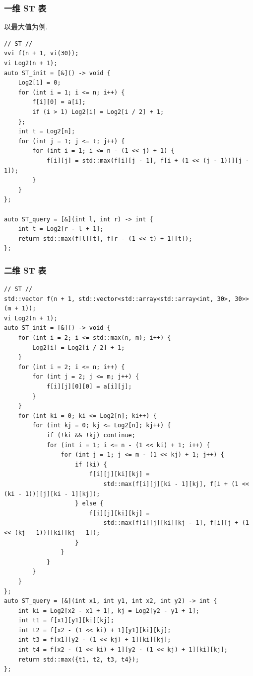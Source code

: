 \documentclass[UTF8, a4paper, titlepage, twoside]{ctexart}
\begin{document}
\subsubsection{ 一维 ST 表 }
以最大值为例. 
\begin{lstlisting}[style = cpp]
// ST //
vvi f(n + 1, vi(30));
vi Log2(n + 1);
auto ST_init = [&]() -> void {
    Log2[1] = 0;
    for (int i = 1; i <= n; i++) {
        f[i][0] = a[i];
        if (i > 1) Log2[i] = Log2[i / 2] + 1;
    };
    int t = Log2[n];
    for (int j = 1; j <= t; j++) {
        for (int i = 1; i <= n - (1 << j) + 1) {
            f[i][j] = std::max(f[i][j - 1], f[i + (1 << (j - 1))][j - 1]);
        }
    }
};

auto ST_query = [&](int l, int r) -> int {
    int t = Log2[r - l + 1];
    return std::max(f[l][t], f[r - (1 << t) + 1][t]);
};
\end{lstlisting}

\subsubsection{ 二维 ST 表 }
\begin{lstlisting}[style=cpp]
// ST //
std::vector f(n + 1, std::vector<std::array<std::array<int, 30>, 30>>(m + 1));
vi Log2(n + 1);
auto ST_init = [&]() -> void {
    for (int i = 2; i <= std::max(n, m); i++) {
        Log2[i] = Log2[i / 2] + 1;
    }
    for (int i = 2; i <= n; i++) {
        for (int j = 2; j <= m; j++) {
            f[i][j][0][0] = a[i][j];
        }
    }
    for (int ki = 0; ki <= Log2[n]; ki++) {
        for (int kj = 0; kj <= Log2[n]; kj++) {
            if (!ki && !kj) continue;
            for (int i = 1; i <= n - (1 << ki) + 1; i++) {
                for (int j = 1; j <= m - (1 << kj) + 1; j++) {
                    if (ki) {
                        f[i][j][ki][kj] =
                            std::max(f[i][j][ki - 1][kj], f[i + (1 << (ki - 1))][j][ki - 1][kj]);
                    } else {
                        f[i][j][ki][kj] =
                            std::max(f[i][j][ki][kj - 1], f[i][j + (1 << (kj - 1))][ki][kj - 1]);
                    }
                }
            }
        }
    }
};
auto ST_query = [&](int x1, int y1, int x2, int y2) -> int {
    int ki = Log2[x2 - x1 + 1], kj = Log2[y2 - y1 + 1];
    int t1 = f[x1][y1][ki][kj];
    int t2 = f[x2 - (1 << ki) + 1][y1][ki][kj];
    int t3 = f[x1][y2 - (1 << kj) + 1][ki][kj];
    int t4 = f[x2 - (1 << ki) + 1][y2 - (1 << kj) + 1][ki][kj];
    return std::max({t1, t2, t3, t4});
};
\end{lstlisting}
\end{document}

